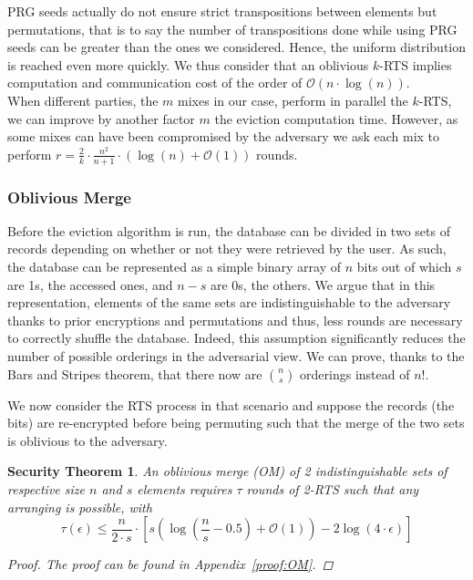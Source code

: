 \documentclass{llncs}
\newtheorem{secthm}{Security Theorem}
\begin{document}
PRG seeds actually do not ensure strict transpositions between elements but permutations, that is to say the number of transpositions done while using PRG seeds can be greater than the ones we considered. Hence, the uniform distribution is reached even more quickly. We thus consider that an oblivious $k$-RTS implies computation and communication cost of the order of $\mathcal{O} \left(n\cdot \log(n)\right)$.\\

When different parties, the $m$ mixes in our case, perform in parallel the $k$-RTS, we can improve by another factor $m$ the eviction computation time. However, as some mixes can have been compromised by the adversary we ask each mix to perform $r = \frac{2}{k}\cdot\frac{n^2}{n+1}\cdot \left ( \log(n) + \mathcal{O}(1) \right ) $ rounds.

%
\subsubsection{Oblivious Merge}\label{OM}
Before the eviction algorithm is run, the database can be divided in two sets of records depending on whether or not they were retrieved by the user. As such, the database can be represented as a simple binary array of $n$ bits out of which $s$ are 1s, the accessed ones, and $n-s$ are 0s, the others.
We argue that in this representation, elements of the same sets are indistinguishable to the adversary thanks to prior encryptions and permutations and thus, less rounds are necessary to correctly shuffle the database.
Indeed, this assumption significantly reduces the number of possible orderings in the adversarial view. We can prove, thanks to the Bars and Stripes theorem, that there now are ${n \choose s}$ orderings instead of $n!$.

We now consider the RTS process in that scenario and suppose the records (the bits) are re-encrypted before being permuting such that the merge of the two sets is oblivious to the adversary.

\begin{secthm}
An oblivious merge (OM) of 2 indistinguishable sets of respective size $n$ and $s$ elements requires $\tau$ rounds of 2-RTS such that any arranging is possible, with
$$\tau(\epsilon) \leq \frac{n}{2\cdot s}  \cdot \left [ s \left( \log \left (\frac{n}{s}-0.5\right) +\mathcal{O}\left(1\right) \right ) - 2\log \left( 4 \cdot \epsilon\right) \right ] $$%
\begin{proof}
The proof can be found in Appendix~\ref{proof:OM}.
\end{proof}
\end{secthm}
\end{document}
